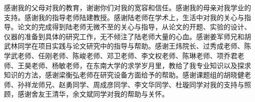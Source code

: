 感谢我的父母对我的教育，谢谢你们对我的宽容和信任。感谢我的母亲对我学业的支持。感谢我的指导老师陆建教授。感谢陆老师在学术上，生活中对我的关心与指导。论文的完成得到陆老师无微不至的关心与指导，从论文的开题、实验的设计、仪器的准备到具体的研究工作，无不倾注了陆老师大量的心血。感谢姜军师兄和胡武林同学在项目实践与论文研究中的指导与帮助。感谢王炜院长、过秀成老师、陈学武老师、任刚老师、陈峻老师、邓卫老师、李文权老师、陈琳老师、项乔君老师、王昊老师、杨敏老师，在东南大学的求学岁月里，教给了我专业知识以及探求知识的方法，感谢梁衡弘老师在研究设备方面给予的帮助。感谢课题组的胡晓健老师、孙祥龙师兄、赵勇同学、周成彦同学、李文华同学、杜璇同学对我的支持与照顾，感谢舍友王清华，余文斌同学对我的帮助与关怀。



